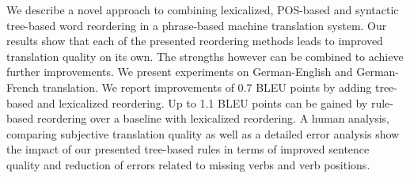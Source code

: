 We describe a novel approach to combining lexicalized, POS-based and syntactic tree-based word reordering in a phrase-based machine translation system.
 Our results show that each of the presented reordering methods leads to
 improved translation quality on its own. The strengths however can be combined
 to achieve further improvements.
 We present experiments on German-English and German-French translation. We
 report improvements of 0.7 BLEU points by adding tree-based and lexicalized
 reordering. Up to 1.1 BLEU points can be gained by rule-based reordering over a
 baseline with lexicalized reordering.
 A human analysis, comparing subjective translation quality as well as a
 detailed error analysis show the impact of our presented tree-based rules in
 terms of improved sentence quality and reduction of errors related to missing
 verbs and verb positions.

